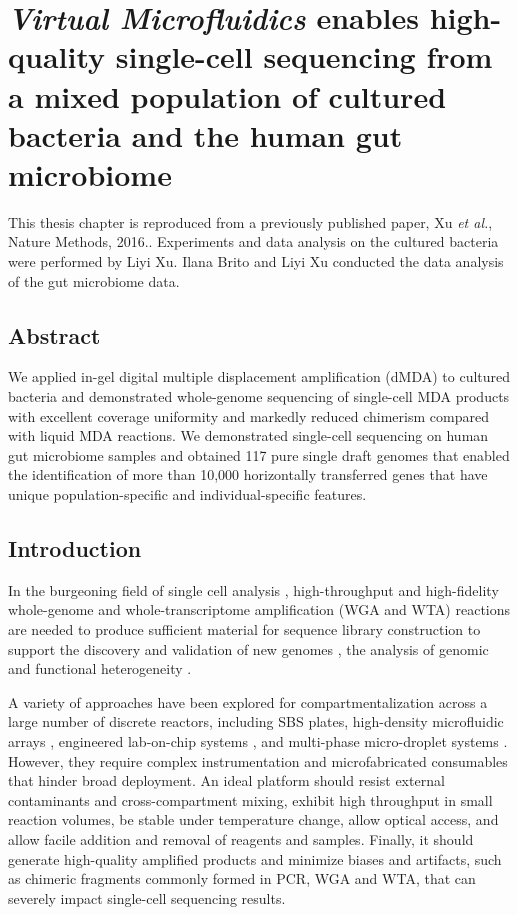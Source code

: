 \chapter{\textbf{\textit{Virtual Microfluidics}} enables high-quality single-cell sequencing from a mixed population of cultured bacteria and the human gut microbiome}

This thesis chapter is reproduced from a previously published paper, Xu \textit{et al.}, Nature Methods, 2016.\cite{Xu:2016wt}. Experiments and data analysis on the cultured bacteria were performed by Liyi Xu. Ilana Brito and Liyi Xu conducted the data analysis of the gut microbiome data.

\section{Abstract}
We applied in-gel digital multiple displacement amplification (dMDA) to cultured bacteria and demonstrated whole-genome sequencing of single-cell MDA products with excellent coverage uniformity and markedly reduced chimerism compared with liquid MDA reactions. We demonstrated single-cell sequencing on human gut microbiome samples and obtained 117 pure single draft genomes that enabled the identification of more than 10,000 horizontally transferred genes that have unique population-specific and individual-specific features.

\section{Introduction}
In the burgeoning field of single cell analysis \cite{Blainey:2013hn}, high-throughput and high-fidelity whole-genome \cite{Raghunathan:2005fg,Zhang:2006hq,Fu:2015gl} and whole-transcriptome amplification (WGA and WTA) reactions are needed to produce sufficient material for sequence library construction to support the discovery and validation of new genomes \cite{Marshall:2012jz,Pamp:2012cj,Hess:2011gu}, the analysis of genomic and functional heterogeneity \cite{Wang:2012bb,Fu:2015gl,Pamp:2012cj}.

A variety of approaches have been explored for compartmentalization across a large number of discrete reactors, including SBS plates\cite{Zhang:2006hq}, high-density microfluidic arrays \cite{Love:2013hf}, engineered lab-on-chip systems \cite{Thorsen:2002dn,Landry:2013dh,deBourcy:2014ji,Marcy:2007ip}, and multi-phase micro-droplet systems \cite{Fu:2015gl,Thorsen:2001td,Hindson:2011fg,Morinishi:2015jx}. However, they require complex instrumentation and microfabricated consumables that hinder broad deployment. An ideal platform should resist external contaminants and cross-compartment mixing, exhibit high throughput in small reaction volumes, be stable under temperature change, allow optical access, and allow facile addition and removal of reagents and samples. Finally, it should generate high-quality amplified products and minimize biases and artifacts, such as chimeric fragments commonly formed in PCR, WGA and WTA, that can severely impact single-cell sequencing results. 

